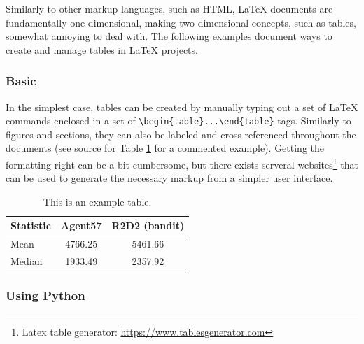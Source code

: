 Similarly to other markup languages, such as HTML, LaTeX documents are fundamentally one-dimensional, making two-dimensional concepts, such as tables, somewhat annoying to deal with. The following examples document ways to create and manage tables in LaTeX projects.

\subsubsection{Basic}

In the simplest case, tables can be created by manually typing out a set of LaTeX commands enclosed in a set of \verb|\begin{table}...\end{table}| tags.
Similarly to figures and sections, they can also be labeled and cross-referenced throughout the documents (see source for Table \ref{tab:example-table} for a commented example).
Getting the formatting right can be a bit cumbersome, but there exists serveral websites\footnote{Latex table generator: \url{https://www.tablesgenerator.com}} that can be used to generate the necessary markup from a simpler user interface.

\begin{table}[H]
    \centering
    \begin{tabular}{l|cc}
        \toprule
        Statistic & Agent57 & R2D2 (bandit) \\
        \midrule
        Mean      & 4766.25 & 5461.66       \\
        Median    & 1933.49 & 2357.92       \\
        \bottomrule
    \end{tabular}
    \caption{This is an example table.}
    \label{tab:example-table}
\end{table}

\subsubsection{Using Python}

